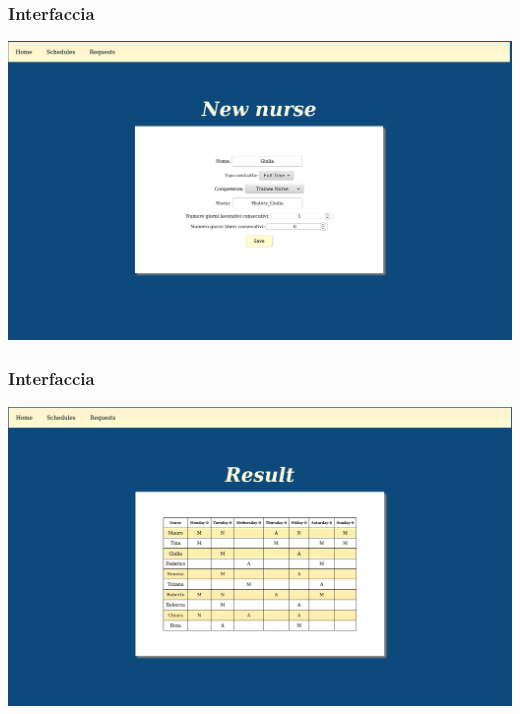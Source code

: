 \documentclass[xcolor={dvipsnames, table}]{beamer}
\begin{document}
\begin{frame}
\frametitle{Interfaccia}
\begin{center}
\includegraphics[width=\linewidth]{img/Schermate/S5.png}
\end{center}
\end{frame}

\begin{frame}
\frametitle{Interfaccia}
\begin{center}
\includegraphics[width=\linewidth]{img/Schermate/Result.png}
\end{center}
\end{frame}
\end{document}
